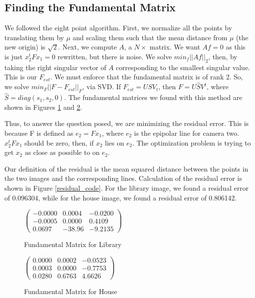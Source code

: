 \documentclass[11pt]{article}
\begin{document}
\subsection{Finding the Fundamental Matrix}
We followed the eight point algorithm. First, we normalize all the points by
translating them by $\mu$ and scaling them such that the mean distance from
$\mu$ (the new origin) is $\sqrt{2}$. Next, we compute $A$, a $N\times$ matrix.
We want $Af = 0$ as this is just $x_2^tFx_1 = 0$ rewritten, but there is noise.
We solve $min_f||Af||_2$, then, by taking the right singular vector of $A$
corresponding to the smallest singular value. This is our $F_{est}$. We must
enforce that the fundamental matrix is of rank 2. So, we solve
$min_F||F-F_{est}||_F$, via SVD. If $F_{est} = USV_t$, then $F = U\hat{S}V^t$,
where $\hat{S} = diag(s_1, s_2, 0)$. The fundamental matrices we found with
this method are shown in Figures \ref{f_lib} and \ref{f_house}.

Thus, to answer the question posed, we are minimizing the residual error.
This is because F is defined as $e_2 = Fx_1$, where $e_2$ is the epipolar line
for camera two.  $x_2^tFx_1$ should be zero, then, if $x_2$ lies on $e_2$. The
optimization problem is trying to get $x_2$ as close as possible to on $e_2$.

Our definition of the residual is the mean squared distance between the points
in the two images and the corresponding lines. Calculation of the residual
error is shown in Figure \ref{residual_code}. For the library image,
we found a residual error of 0.096304, while for the house image, we found
a residual error of 0.806142.

\begin{figure}[h!]
  \caption{Fundamental Matrix for Library}
  \label{f_lib}
  \centering
    $\begin{pmatrix}
      -0.0000&0.0004&-0.0200\\
      -0.0005&0.0000&0.4109\\
      0.0697&-38.96&-9.2135
    \end{pmatrix}$
\end{figure}
\begin{figure}[h!]
  \caption{Fundamental Matrix for House}
  \label{f_house}
  \centering
    $\begin{pmatrix}
      0.0000&0.0002&-0.0523\\
      0.0003&0.0000&-0.7753\\
      0.0280&0.6763& 4.6626
    \end{pmatrix}$
\end{figure}
\end{document}
